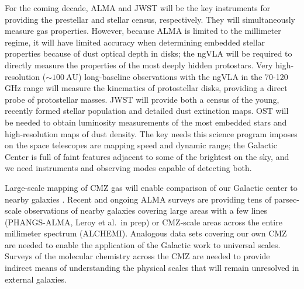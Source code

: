 \documentclass[modern]{aastex62}
\begin{document}
For the coming decade, ALMA and JWST will be the key instruments for providing
the prestellar and stellar census, respectively.  They will simultaneously measure
gas properties.  However, because ALMA is limited to the millimeter regime,
it will have limited accuracy when determining embedded stellar properties because
of dust optical depth in disks; the ngVLA will be required to directly measure
the properties of the most deeply hidden protostars.  Very high-resolution ($\sim100\mathrm{~AU}$)
long-baseline observations with the ngVLA in the 70-120 GHz range will measure
the kinematics of protostellar disks, providing a direct probe of protostellar
masses.  JWST will provide both
a census of the young, recently formed stellar population and detailed dust 
extinction maps.  OST will be needed to obtain luminosity measurements of the
most embedded stars and high-resolution maps of dust density.  The key needs
this science program imposes on the space telescopes are mapping speed
and dynamic range; the Galactic Center is full of faint features adjacent
to some of the brightest on the sky, and we need instruments and observing
modes capable of detecting both.


Large-scale mapping of CMZ gas will enable comparison of our Galactic center to
nearby galaxies \citep[e.g.,][]{Leroy2018a}.
Recent and ongoing ALMA
surveys are providing tens of parsec-scale observations of nearby galaxies
covering large areas with a few lines (PHANGS-ALMA, Leroy et al.\ in prep) or
CMZ-scale areas across the entire millimeter spectrum (ALCHEMI).  Analogous
data sets covering our own CMZ are needed to enable the application
of the Galactic work to universal scales.  Surveys of the molecular
chemistry across the CMZ are needed to provide indirect means of understanding
the physical scales that will remain unresolved in external galaxies.



\end{document}
